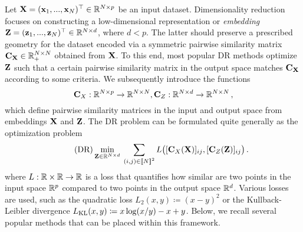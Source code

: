 Let ${\mathbf{X}} = ({\mathbf{x}}_1, ..., {\mathbf{x}}_N) ^\top \in \mathbb{R}^{N \times p}$ be an input dataset. Dimensionality reduction focuses on constructing a low-dimensional representation or \emph{embedding} ${\mathbf{Z}} = ({\mathbf{z}}_1, ..., {\mathbf{z}}_N)^\top \in \mathbb{R}^{N \times d}$, where $d< p$. The latter should preserve a prescribed geometry for the dataset encoded via a symmetric pairwise similarity matrix ${\mathbf{C}}_{{\mathbf{X}}} \in \mathbb{R}_+^{N \times N}$ obtained from ${\mathbf{X}}$.
To this end, most popular DR methods optimize ${\mathbf{Z}}$ such that a certain pairwise similarity matrix in the output space matches ${\mathbf{C}}_{{\mathbf{X}}}$ according to some criteria. We subsequently introduce the functions
\begin{equation}
\label{eq:sim_function}
{\mathbf{C}}_{X}: \mathbb{R}^{N \times p} \to \mathbb{R}^{N \times N}, {\mathbf{C}}_{Z}: \mathbb{R}^{N \times d} \to \mathbb{R}^{N \times N}\,,
\end{equation}
which define pairwise similarity matrices in the input and output space from embeddings ${\mathbf{X}}$ and ${\mathbf{Z}}$.
 The DR problem can be formulated quite generally as the optimization problem
\begin{equation}
\label{eq:DR_criterion}\tag{DR}
\min_{\mZ \in \R^{N \times d}} \: \sum_{(i,j) \in \integ{N}^2}  L\big([\simiX(\mX)]_{ij}, [\simi(\mZ)]_{ij}\big) \,. %
\end{equation}
where $L:\mathbb{R} \times \mathbb{R} \rightarrow \mathbb{R}$ is a loss that quantifies how similar are two points in the input space $\mathbb{R}^{p}$ compared to two points in the output space $\mathbb{R}^{d}$. Various losses are used, such as the quadratic loss $L_2(x,y) \coloneqq (x - y)^2$
or the Kullback-Leibler divergence $L_{\operatorname{KL}}(x,y) \coloneqq x \log (x/y) - x +y$.
Below, we recall several popular methods that can be placed within this framework.

